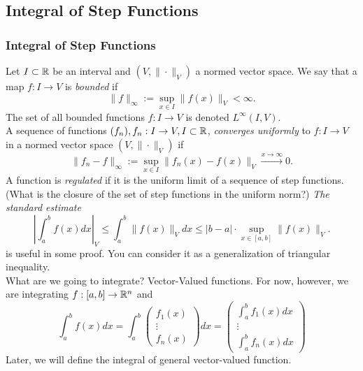 \documentclass[12pt, t]{beamer}
\renewcommand{\emph}[1]{{\color{Turquoise3}\textsl{#1}}}
\newcommand{\nullspace}{~\\[15pt]}
\begin{document}
\subsection{Integral of Step Functions}
\begin{frame}[allowframebreaks]
    \frametitle{Integral of Step Functions}
    Let $I\subset\mathbb{R}$ be an interval and $(V,\|\cdot\|_V)$ a normed vector space. We say that a map $f:I\to V$ is \emph{bounded} if
    \begin{equation}\label{2.2.5}
        \|f\|_{\infty}:=\sup\limits_{x\in I}\|f(x)\|_V<\infty.
    \end{equation}
    The set of all bounded functions $f:I\to V$ is denoted $L^{\infty}(I,V)$.
    \nullspace
    A sequence of functions $(f_n),f_n:I\to V,I\subset\mathbb{R}$, \emph{converges uniformly} to $f:I\to V$ in a normed vector space $(V,\|\cdot\|_V)$ if
    \[\|f_n-f\|_{\infty}:=\sup_{x\in I}\|f_n(x)-f(x)\|_V\xrightarrow[]{x\to\infty}0.\]
    A function is \emph{regulated} if it is the uniform limit of a sequence of step functions.
    (What is the closure of the set of step functions in the uniform norm?)
    \newpage
    \emph{The standard estimate}
    \[\left|\int_{a}^{b}f(x)dx\right|_V\leq\int_{a}^{b}\|f(x)\|_Vdx\leq|b-a|\cdot\sup\limits_{x\in[a,b]}\|f(x)\|_V.\]
    is useful in some proof. You can consider it as a generalization of triangular inequality.
    \nullspace
    What are we going to integrate? Vector-Valued functions. For now, however, we are integrating $f:[a,b]\to \mathbb{R}^n$ and
    \[\int_{a}^{b}f(x)dx=\int_{a}^{b}\begin{pmatrix}
            f_1(x) \\
            \vdots \\
            f_n(x)
        \end{pmatrix}dx=\begin{pmatrix}
            \int_{a}^{b}f_1(x)dx \\
            \vdots               \\
            \int_{a}^{b}f_n(x)dx
        \end{pmatrix}\]
    Later, we will define the integral of general vector-valued function.
\end{frame}
\end{document}
